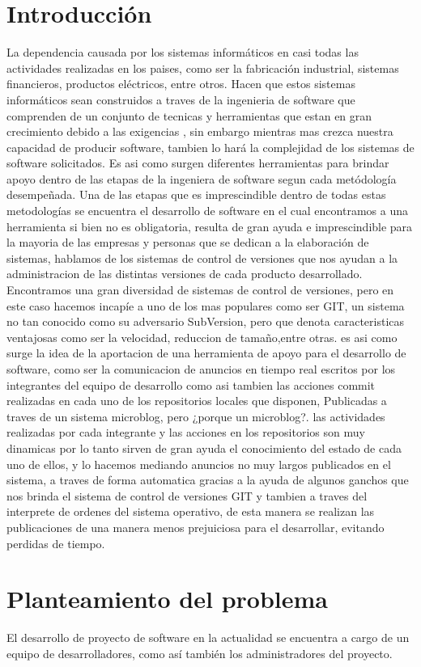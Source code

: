 \section{Introducción}
La dependencia causada por los sistemas informáticos en casi todas las actividades realizadas en los paises, como ser la fabricación industrial, sistemas financieros, productos eléctricos, entre otros.
Hacen que estos sistemas informáticos sean construidos a traves de la ingenieria de software que comprenden de un conjunto de tecnicas y herramientas que estan en gran crecimiento debido a las exigencias , sin embargo mientras mas crezca nuestra capacidad de producir software, tambien lo hará la complejidad de los sistemas de software solicitados.
Es asi como surgen diferentes herramientas para brindar apoyo dentro de las etapas de la ingeniera de software segun cada metódología desempeñada. Una de las etapas que es imprescindible dentro de todas estas metodologías se encuentra el desarrollo de software en el cual encontramos a una herramienta si bien no es obligatoria, resulta de gran ayuda e imprescindible para la mayoria de las empresas y personas que se dedican a la elaboración de sistemas, hablamos de los sistemas de control de versiones que nos ayudan a la administracion de las distintas versiones de cada producto desarrollado.
Encontramos una gran diversidad de sistemas de control de versiones, pero en este caso hacemos incapíe a uno de los mas populares como ser GIT, un sistema no tan conocido como su adversario SubVersion, pero que denota caracteristicas ventajosas como ser la velocidad, reduccion de tamaño,entre otras. es asi como surge la idea de la aportacion de una herramienta de apoyo para el desarrollo de software, como ser la comunicacion de anuncios en tiempo real escritos por los integrantes del equipo de desarrollo como asi tambien las acciones commit realizadas en cada uno de los repositorios locales que disponen, Publicadas a traves de un sistema microblog, pero ¿porque un microblog?. las actividades realizadas por cada integrante y las acciones en los repositorios son muy dinamicas por lo tanto sirven de gran ayuda el conocimiento del estado de cada uno de ellos, y lo hacemos mediando anuncios no muy largos publicados en el sistema, a traves de forma automatica gracias a la ayuda de algunos ganchos que nos brinda el sistema de control de versiones GIT y tambien a traves del interprete de ordenes del sistema operativo, de esta manera se realizan las publicaciones de una manera menos prejuiciosa para el desarrollar, evitando perdidas de tiempo.
\section{Planteamiento del problema}
El desarrollo de proyecto de software en la actualidad se encuentra a cargo de un equipo de desarrolladores, como así también los administradores del proyecto.

